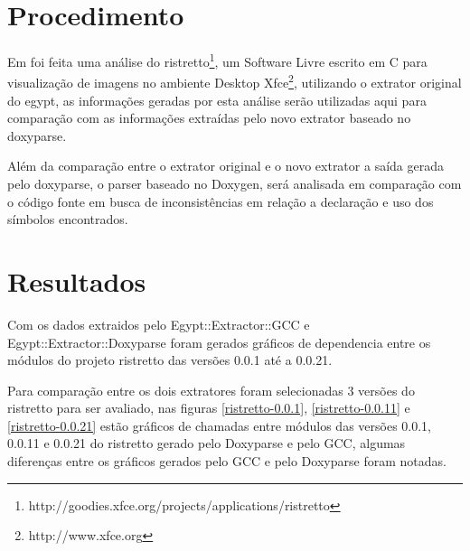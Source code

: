 \section{Procedimento}

Em \cite{StructuralComplexityEvolution} foi feita uma análise do
ristretto\footnote{http://goodies.xfce.org/projects/applications/ristretto}, um
Software Livre escrito em C para visualização de imagens no ambiente Desktop
Xfce\footnote{http://www.xfce.org}, utilizando o extrator original do egypt, as
informações geradas por esta análise serão utilizadas aqui para comparação com
as informações extraídas pelo novo extrator baseado no doxyparse.

Além da comparação entre o extrator original e o novo extrator a saída
gerada pelo doxyparse, o parser baseado no Doxygen, será analisada em
comparação com o código fonte em busca de inconsistências em relação a
declaração e uso dos símbolos encontrados.

\section{Resultados}

Com os dados extraidos pelo Egypt::Extractor::GCC e Egypt::Extractor::Doxyparse
foram gerados gráficos de dependencia entre os módulos do projeto ristretto das
versões 0.0.1 até a 0.0.21.


Para comparação entre os dois extratores foram selecionadas 3 versões do
ristretto para ser avaliado, nas figuras \ref{ristretto-0.0.1},
\ref{ristretto-0.0.11} e \ref{ristretto-0.0.21} estão gráficos de chamadas
entre módulos das versões 0.0.1, 0.0.11 e 0.0.21 do ristretto gerado pelo
Doxyparse e pelo GCC, algumas diferenças entre os gráficos gerados pelo GCC e
pelo Doxyparse foram notadas. 

